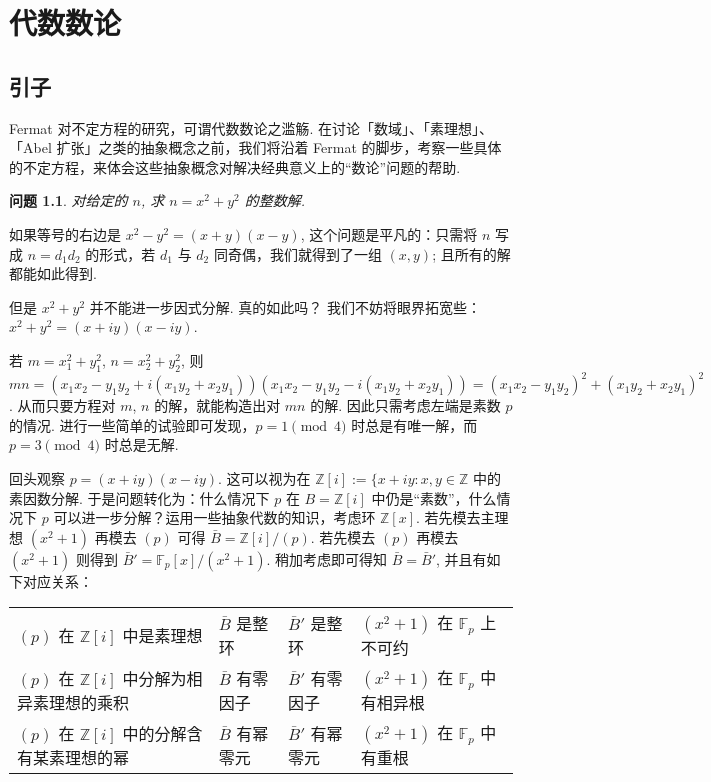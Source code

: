 \documentclass[UTF8]{ctexbook}
\newcommand\Z{\mathbb Z}
\newcommand\F{\mathbb F}
\newtheorem{question}{问题}
\begin{document}
\chapter{代数数论}

\section{引子}
Fermat 对不定方程的研究，可谓代数数论之滥觞.  在讨论「数域」、「素理想」、「Abel 扩张」之类的抽象概念之前，我们将沿着 Fermat 的脚步，考察一些具体的不定方程，来体会这些抽象概念对解决经典意义上的“数论”问题的帮助.

\begin{question}
  对给定的 $n$, 求 $n = x^2 + y^2$ 的整数解.
\end{question}


如果等号的右边是 $x^2 - y^2 = (x+y)(x-y)$, 这个问题是平凡的：只需将 $n$ 写成 $n = d_1d_2$ 的形式，若 $d_1$ 与 $d_2$ 同奇偶，我们就得到了一组 $(x, y)$; 且所有的解都能如此得到.

但是 $x^2 + y^2$ 并不能进一步因式分解.  {\kaishu 真的如此吗？}  我们不妨将眼界拓宽些：$x^2 + y^2 = (x+iy)(x-iy)$.

若 $m = x_1^2 + y_1^2$, $n = x_2^2 + y_2^2$, 则 $mn = (x_1x_2-y_1y_2 + i(x_1y_2+x_2y_1))(x_1x_2-y_1y_2 - i(x_1y_2+x_2y_1)) = (x_1x_2-y_1y_2)^2 + (x_1y_2+x_2y_1)^2$.  从而只要方程对 $m$, $n$ 的解，就能构造出对 $mn$ 的解.  因此只需考虑左端是素数 $p$ 的情况.  进行一些简单的试验即可发现，$p = 1 \pmod 4$ 时总是有唯一解，而 $p = 3 \pmod 4$ 时总是无解.

回头观察 $p = (x+iy)(x-iy)$.  这可以视为在 $\Z[i] := \{x+iy : x, y \in \Z$ 中的素因数分解.  于是问题转化为：什么情况下 $p$ 在 $B = \Z[i]$ 中仍是“素数”，什么情况下 $p$ 可以进一步分解？运用一些抽象代数的知识，考虑环 $\Z[x]$.  若先模去主理想 $(x^2+1)$ 再模去 $(p)$ 可得 $\bar B = \Z[i]/(p)$.  若先模去 $(p)$ 再模去 $(x^2+1)$ 则得到 $\bar B' = \F_p[x]/(x^2+1)$.  稍加考虑即可得知 $\bar B = \bar B'$, 并且有如下对应关系：

\begin{table}[h]
  \begin{tabular}{llll}
    $(p)$ 在 $\Z[i]$ 中是素理想 & $\bar B$ 是整环 & $\bar B'$ 是整环 & $(x^2+1)$ 在 $\F_p$ 上不可约 \\
    $(p)$ 在 $\Z[i]$ 中分解为相异素理想的乘积 & $\bar B$ 有零因子 & $\bar B'$ 有零因子 & $(x^2+1)$ 在 $\F_p$ 中有相异根 \\
    $(p)$ 在 $\Z[i]$ 中的分解含有某素理想的幂 & $\bar B$ 有幂零元 & $\bar B'$ 有幂零元 & $(x^2+1)$ 在 $\F_p$ 中有重根
  \end{tabular}
\end{table}
\end{document}
